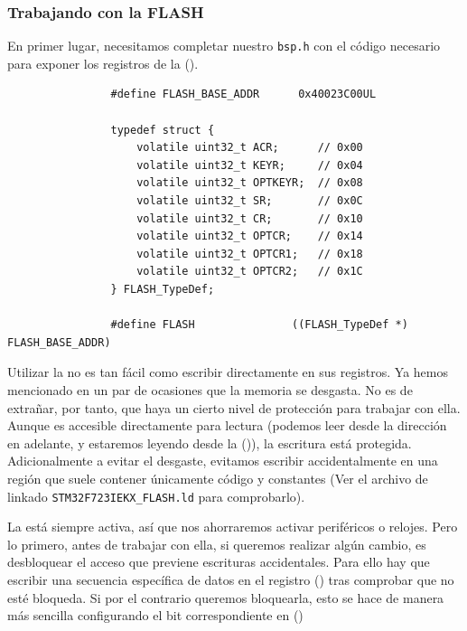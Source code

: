 \documentclass[../main.tex]{subfiles}
\begin{document}
        \subsubsection{Trabajando con la FLASH}

            En primer lugar, necesitamos completar nuestro \texttt{bsp.h} con el código necesario para exponer los registros de la  (\REFMAN[3]).

            \begin{lstlisting}
                #define FLASH_BASE_ADDR 	 0x40023C00UL

                typedef struct {
                    volatile uint32_t ACR;      // 0x00
                    volatile uint32_t KEYR;     // 0x04
                    volatile uint32_t OPTKEYR;  // 0x08
                    volatile uint32_t SR;       // 0x0C
                    volatile uint32_t CR;       // 0x10
                    volatile uint32_t OPTCR;    // 0x14
                    volatile uint32_t OPTCR1;   // 0x18
                    volatile uint32_t OPTCR2;   // 0x1C
                } FLASH_TypeDef;

                #define FLASH             	((FLASH_TypeDef *) FLASH_BASE_ADDR)
            \end{lstlisting}

            Utilizar la  no es tan fácil como escribir directamente en sus registros. Ya hemos mencionado en un par de ocasiones que la memoria se desgasta. No es de extrañar, por tanto, que haya un cierto nivel de protección para trabajar con  ella. Aunque es accesible directamente para lectura  (podemos leer desde la dirección  en adelante, y estaremos leyendo desde la  (\REFMAN[1.6.2])), la escritura está protegida. Adicionalmente a evitar el desgaste, evitamos escribir accidentalmente en una región que suele contener únicamente código y constantes (Ver el archivo de linkado \texttt{STM32F723IEKX\_FLASH.ld} para comprobarlo).

            La  está siempre activa, así que nos ahorraremos activar periféricos o relojes. Pero lo primero, antes de trabajar con ella, si queremos realizar algún cambio, es desbloquear el acceso que previene escrituras accidentales. Para ello hay que escribir una secuencia específica de datos en el registro  (\REFMAN[3.7.2]) tras comprobar que no esté bloqueda. Si por el contrario queremos bloquearla, esto se hace de manera más sencilla configurando el bit correspondiente en  (\REFMAN[3.7.5])
\end{document}
